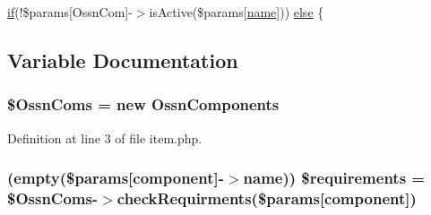 \begin{DoxyCompactItemize}
\item 
\hyperlink{jquery_8tokeninput_8js_ad8dd46a3cbc004569e34401e9e71771a}{if}(!\$params\mbox{[}\textquotesingle{}Ossn\+Com\textquotesingle{}\mbox{]}-\/$>$is\+Active(\$params\mbox{[}\textquotesingle{}\hyperlink{user_8php_a765af5e9671743530143a6d3670fd9a6}{name}\textquotesingle{}\mbox{]})) \hyperlink{system_2plugins_2default_2admin_2components_2list_2item_8php_ac434214b6967460ebc7e0b81f4390ce0}{else} \{
\end{DoxyCompactItemize}


\subsection{Variable Documentation}
\subsubsection[{\texorpdfstring{\$\+Ossn\+Coms}{$OssnComs}}]{\setlength{\rightskip}{0pt plus 5cm}\$Ossn\+Coms = new {\bf Ossn\+Components}}\hypertarget{system_2plugins_2default_2admin_2components_2list_2item_8php_a269e9c1471f261d84ee1a4f55bd70853}{}\label{system_2plugins_2default_2admin_2components_2list_2item_8php_a269e9c1471f261d84ee1a4f55bd70853}


Definition at line 3 of file item.\+php.

\subsubsection[{\texorpdfstring{\$requirements}{$requirements}}]{ (empty(\$params\mbox{[}\textquotesingle{}component\textquotesingle{}\mbox{]}-\/$>${\bf name})) \$requirements = \$Ossn\+Coms-\/$>$check\+Requirments(\$params\mbox{[}\textquotesingle{}component\textquotesingle{}\mbox{]})}\hypertarget{system_2plugins_2default_2admin_2components_2list_2item_8php_a01270c6ccb33bf873a0aca0e6878fe44}{}\label{system_2plugins_2default_2admin_2components_2list_2item_8php_a01270c6ccb33bf873a0aca0e6878fe44}


